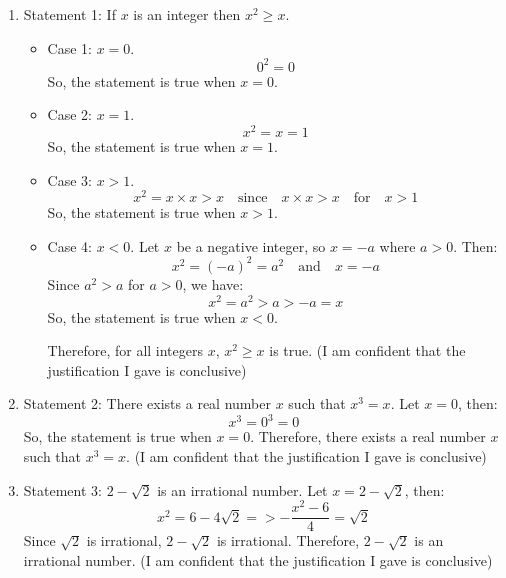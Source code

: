 \documentclass{article}
\begin{document}
\begin{enumerate}
    \item Statement 1: If $x$ is an integer then $x^2 \geq x$.
          \begin{itemize}
              \item Case 1: $x = 0$.
                    \[
                        0^2 = 0
                    \]
                    So, the statement is true when $x = 0$.
              \item Case 2: $x = 1$.
                    \[
                        x^2 = x = 1
                    \]
                    So, the statement is true when $x = 1$.
              \item Case 3: $x > 1$.
                    \[
                        x^2 = x \times x > x \quad \text{since} \quad x \times x > x \quad \text{for} \quad x > 1
                    \]
                    So, the statement is true when $x > 1$.
              \item Case 4: $x < 0$.\newline
                    Let \(x\) be a negative integer, so \(x = -a\) where \(a > 0\). Then:
                    \[
                        x^2 = {(-a)}^2 = a^2 \quad \text{and} \quad x = -a
                    \]
                    Since \(a^2 > a\) for \(a > 0\), we have:
                    \[
                        x^2 = a^2 > a > -a = x
                    \]
                    So, the statement is true when $x < 0$.

                    Therefore, for all integers \(x\), \(x^2 \geq x\) is true.\newline
                    (I am confident that the justification I gave is conclusive)
          \end{itemize}
    \item Statement 2: There exists a real number $x$ such that $x^3 = x$.\newline
          Let \(x = 0\), then:
          \[
              x^3 = 0^3 = 0
          \]
          So, the statement is true when \(x = 0\).\newline
          Therefore, there exists a real number \(x\) such that \(x^3 = x\).\newline
          (I am confident that the justification I gave is conclusive)
    \item Statement 3: $2 - \sqrt{2}$ is an irrational number.\newline
          Let \(x = 2 - \sqrt{2}\), then:
          \[
              x^2 = 6 - 4\sqrt{2} => -\frac{x^2-6}{4} = \sqrt{2}
          \]
          Since \(\sqrt{2}\) is irrational, \(2 - \sqrt{2}\) is irrational.\newline
          Therefore, \(2 - \sqrt{2}\) is an irrational number.\newline
          (I am confident that the justification I gave is conclusive)
\end{enumerate}
\end{document}
